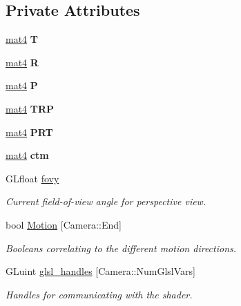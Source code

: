 \subsection*{\-Private \-Attributes}
\begin{DoxyCompactItemize}
\item 
\hypertarget{class_camera_aa4cb92b539c9a9707a12d7025ed889f6}{\hyperlink{class_angel_1_1mat4}{mat4} {\bfseries \-T}}\label{class_camera_aa4cb92b539c9a9707a12d7025ed889f6}

\item 
\hypertarget{class_camera_a8fd028120b18556c43ad86756e637fbc}{\hyperlink{class_angel_1_1mat4}{mat4} {\bfseries \-R}}\label{class_camera_a8fd028120b18556c43ad86756e637fbc}

\item 
\hypertarget{class_camera_a0bee6fbae6ec5960850a5fb858f3912a}{\hyperlink{class_angel_1_1mat4}{mat4} {\bfseries \-P}}\label{class_camera_a0bee6fbae6ec5960850a5fb858f3912a}

\item 
\hypertarget{class_camera_a2ec15fbfe495b11f60b68726d5a22bb9}{\hyperlink{class_angel_1_1mat4}{mat4} {\bfseries \-T\-R\-P}}\label{class_camera_a2ec15fbfe495b11f60b68726d5a22bb9}

\item 
\hypertarget{class_camera_a6f5bb6e124f8e4bbfd163a2cb2f505dd}{\hyperlink{class_angel_1_1mat4}{mat4} {\bfseries \-P\-R\-T}}\label{class_camera_a6f5bb6e124f8e4bbfd163a2cb2f505dd}

\item 
\hypertarget{class_camera_a9b1e81e3f5531390bb6a599dca0d2444}{\hyperlink{class_angel_1_1mat4}{mat4} {\bfseries ctm}}\label{class_camera_a9b1e81e3f5531390bb6a599dca0d2444}

\item 
\-G\-Lfloat \hyperlink{class_camera_acc8b97facc57059530efad534c2f8314}{fovy}
\begin{DoxyCompactList}\small\item\em \-Current field-\/of-\/view angle for perspective view. \end{DoxyCompactList}\item 
bool \hyperlink{class_camera_a39746b4fadf30bba6bdc8aa6acfdc6f2}{\-Motion} \mbox{[}\-Camera\-::\-End\mbox{]}
\begin{DoxyCompactList}\small\item\em \-Booleans correlating to the different motion directions. \end{DoxyCompactList}\item 
\-G\-Luint \hyperlink{class_camera_a1635486d7f9e0d52b241899a270ee335}{glsl\-\_\-handles} \mbox{[}\-Camera\-::\-Num\-Glsl\-Vars\mbox{]}
\begin{DoxyCompactList}\small\item\em \-Handles for communicating with the shader. \end{DoxyCompactList}\end{DoxyCompactItemize}


